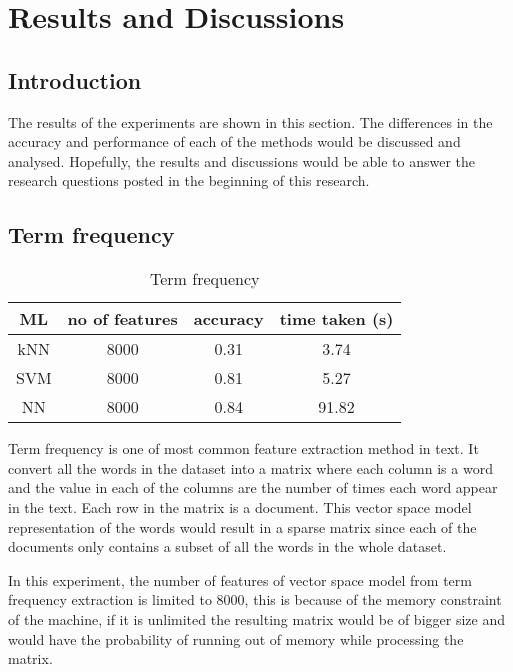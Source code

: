 
\chapter{Results and Discussions}

\section{Introduction}
The results of the experiments are shown in this section. The differences in the accuracy and performance of each of the methods would be discussed and analysed. Hopefully, the results and discussions would be able to answer the research questions posted in the beginning of this research.

\section{Term frequency}

\begin{table}[ht]
	\centering
	\begin{tabular}{|| c | c | c | c||}
		\hline
		ML & no of features & accuracy & time taken (s) \\ [0.5ex]
		\hline\hline
		kNN & 8000 & 0.31 & 3.74 \\ 
		\hline
		SVM & 8000 & 0.81 & 5.27 \\
		\hline
		NN & 8000 & 0.84 & 91.82 \\
		\hline
	\end{tabular}
\caption{Term frequency}
\label{tbl:termFrequency}
\end{table}

Term frequency is one of most common feature extraction method in text. It convert all the words in the dataset into a matrix where each column is a word and the value in each of the columns are the number of times each word appear in the text. Each row in the matrix is a document. This vector space model representation of the words would result in a sparse matrix since each of the documents only contains a subset of all the words in the whole dataset. 

In this experiment, the number of features of vector space model from term frequency extraction is limited to 8000, this is because of the memory constraint of the machine, if it is unlimited the resulting matrix would be of bigger size and would have the probability of running out of memory while processing the matrix. 

